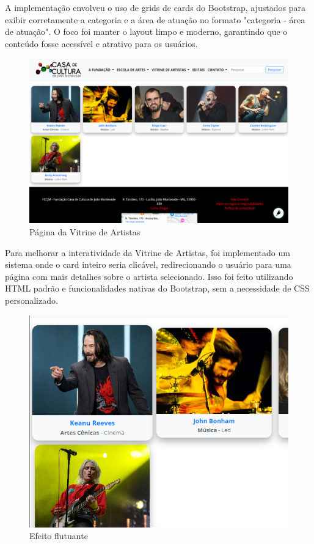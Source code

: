 A implementação envolveu o uso de grids de cards do Bootstrap, ajustados para exibir corretamente a categoria e a área de atuação no formato "categoria - área de atuação". O foco foi manter o layout limpo e moderno, garantindo que o conteúdo fosse acessível e atrativo para os usuários.

\begin{figure}[htb]
	\caption{\label{fig_grafico}Página da Vitrine de Artistas}
	\begin{center}
	    \includegraphics[scale=0.35]{./img/vitrine_de_artistas.png}
	\end{center}
\end{figure}

Para melhorar a interatividade da Vitrine de Artistas, foi implementado um sistema onde o card inteiro seria clicável, redirecionando o usuário para uma página com mais detalhes sobre o artista selecionado. Isso foi feito utilizando \ac{HTML} padrão e funcionalidades nativas do Bootstrap, sem a necessidade de \ac{CSS} personalizado.


\begin{figure}[htb]
	\caption{\label{fig_grafico}Efeito flutuante}
	\begin{center}
	    \includegraphics[scale=0.5]{./img/vitrine_de_artistas_hover.png}
	\end{center}
\end{figure}

